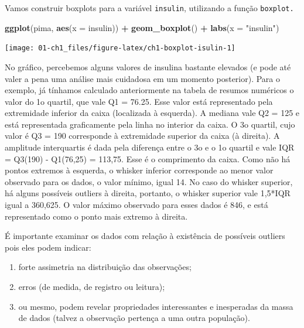 \documentclass[
]{book}
\newenvironment{Shaded}{\begin{snugshade}}{\end{snugshade}}
\newcommand{\DataTypeTok}[1]{\textcolor[rgb]{0.13,0.29,0.53}{#1}}
\newcommand{\KeywordTok}[1]{\textcolor[rgb]{0.13,0.29,0.53}{\textbf{#1}}}
\newcommand{\NormalTok}[1]{#1}
\newcommand{\OperatorTok}[1]{\textcolor[rgb]{0.81,0.36,0.00}{\textbf{#1}}}
\newcommand{\StringTok}[1]{\textcolor[rgb]{0.31,0.60,0.02}{#1}}
\providecommand{\tightlist}{%
  \setlength{\itemsep}{0pt}\setlength{\parskip}{0pt}}
\theoremstyle{definition}
\theoremstyle{definition}
\theoremstyle{definition}
\theoremstyle{remark}
\begin{document}
Vamos construir boxplots para a variável \texttt{insulin}, utilizando a função \texttt{boxplot.}

\begin{Shaded}
\begin{Highlighting}[]
\KeywordTok{ggplot}\NormalTok{(pima, }\KeywordTok{aes}\NormalTok{(}\DataTypeTok{x =}\NormalTok{ insulin)) }\OperatorTok{+}
\StringTok{  }\KeywordTok{geom_boxplot}\NormalTok{() }\OperatorTok{+}
\StringTok{  }\KeywordTok{labs}\NormalTok{(}\DataTypeTok{x =} \StringTok{"insulin"}\NormalTok{)}
\end{Highlighting}
\end{Shaded}

\texttt{[image: 01-ch1\_files/figure-latex/ch1-boxplot-isulin-1]}

No gráfico, percebemos alguns valores de insulina bastante elevados (e pode até valer a pena uma análise mais cuidadosa em um momento posterior). Para o exemplo, já tínhamos calculado anteriormente na tabela de resumos numéricos o valor do 1o quartil, que vale Q1 = 76.25. Esse valor está representado pela extremidade inferior da caixa (localizada à esquerda). A mediana vale Q2 = 125 e está representada graficamente pela linha no interior da caixa. O 3o quartil, cujo valor é Q3 = 190 corresponde à extremidade superior da caixa (à direita). A amplitude interquartis é dada pela diferença entre o 3o e o 1o quartil e vale IQR = Q3(190) - Q1(76,25) = 113,75. Esse é o comprimento da caixa. Como não há pontos extremos à esquerda, o whisker inferior corresponde ao menor valor observado para os dados, o valor mínimo, igual 14. No caso do whisker superior, há alguns possíveis outliers à direita, portanto, o whisker superior vale 1,5*IQR igual a 360,625. O valor máximo observado para esses dados é 846, e está representado como o ponto mais extremo à direita.

É importante examinar os dados com relação à existência de possíveis outliers pois eles podem indicar:

\begin{enumerate}
\def\labelenumi{(\arabic{enumi})}
\tightlist
\item
  forte assimetria na distribuição das observações;\\
\item
  erros (de medida, de registro ou leitura);\\
\item
  ou mesmo, podem revelar propriedades interessantes e inesperadas da massa de dados (talvez a observação pertença a uma outra população).
\end{enumerate}
\end{document}
